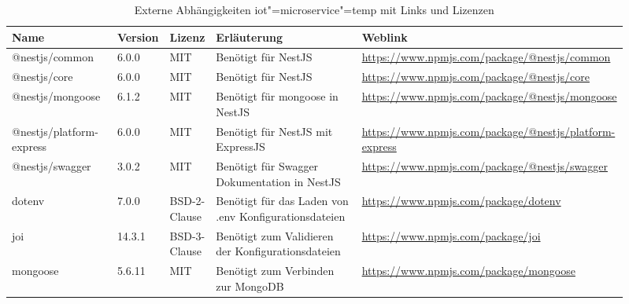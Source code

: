 \begin{landscape}
\begin{table}[htb]
	\caption{Externe Abhängigkeiten iot"=microservice"=temp mit Links und Lizenzen}
	\begin{tabular}{|p{0.18\linewidth}|p{0.06\linewidth}|p{0.06\linewidth}|p{0.28\linewidth}|p{0.33\linewidth}|}
		\hline
		Name & Version & Lizenz & Erläuterung & Weblink \\ \hline
		@nestjs/common & 6.0.0 & MIT & Benötigt für NestJS & \small\url{https://www.npmjs.com/package/@nestjs/common} \\ \hline
		@nestjs/core & 6.0.0 & MIT & Benötigt für NestJS & \small\url{https://www.npmjs.com/package/@nestjs/core} \\ \hline
		@nestjs/mongoose & 6.1.2 & MIT & Benötigt für mongoose in NestJS & \small\url{https://www.npmjs.com/package/@nestjs/mongoose} \\ \hline
		@nestjs/platform-express & 6.0.0 & MIT & Benötigt für NestJS mit ExpressJS & \small\url{https://www.npmjs.com/package/@nestjs/platform-express} \\ \hline
		@nestjs/swagger & 3.0.2 & MIT & Benötigt für Swagger Dokumentation in NestJS & \small\url{https://www.npmjs.com/package/@nestjs/swagger} \\ \hline
		dotenv & 7.0.0 & BSD-2-Clause & Benötigt für das Laden von .env Konfigurationsdateien & \small\url{https://www.npmjs.com/package/dotenv} \\ \hline
		joi & 14.3.1 & BSD-3-Clause & Benötigt zum Validieren der Konfigurationsdateien & \small\url{https://www.npmjs.com/package/joi} \\ \hline
		mongoose & 5.6.11 & MIT & Benötigt zum Verbinden zur MongoDB & \small\url{https://www.npmjs.com/package/mongoose} \\ \hline
	\end{tabular}
	\label{tbl:dependenciesMicroTemp}
\end{table}


\end{landscape}
